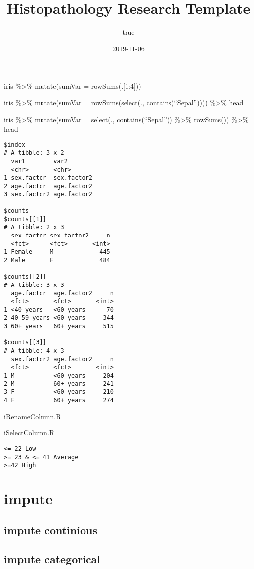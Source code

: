 \documentclass[]{article}
\title{Histopathology Research Template}
\author{true}
\date{2019-11-06}
\begin{document}
\maketitle

{
\setcounter{tocdepth}{5}
\tableofcontents
}
iris \%\textgreater\% mutate(sumVar = rowSums(.{[}1:4{]}))

iris \%\textgreater\% mutate(sumVar = rowSums(select(.,
contains(``Sepal'')))) \%\textgreater\% head

iris \%\textgreater\% mutate(sumVar = select(., contains(``Sepal''))
\%\textgreater\% rowSums()) \%\textgreater\% head

\begin{verbatim}
$index
# A tibble: 3 x 2
  var1        var2       
  <chr>       <chr>      
1 sex.factor  sex.factor2
2 age.factor  age.factor2
3 sex.factor2 age.factor2

$counts
$counts[[1]]
# A tibble: 2 x 3
  sex.factor sex.factor2     n
  <fct>      <fct>       <int>
1 Female     M             445
2 Male       F             484

$counts[[2]]
# A tibble: 3 x 3
  age.factor  age.factor2     n
  <fct>       <fct>       <int>
1 <40 years   <60 years      70
2 40-59 years <60 years     344
3 60+ years   60+ years     515

$counts[[3]]
# A tibble: 4 x 3
  sex.factor2 age.factor2     n
  <fct>       <fct>       <int>
1 M           <60 years     204
2 M           60+ years     241
3 F           <60 years     210
4 F           60+ years     274
\end{verbatim}

iRenameColumn.R

iSelectColumn.R

\begin{verbatim}
<= 22 Low
>= 23 & <= 41 Average 
>=42 High
\end{verbatim}

\hypertarget{impute}{%
\section{impute}\label{impute}}

\hypertarget{impute-continious}{%
\subsection{impute continious}\label{impute-continious}}

\hypertarget{impute-categorical}{%
\subsection{impute categorical}\label{impute-categorical}}
\end{document}
